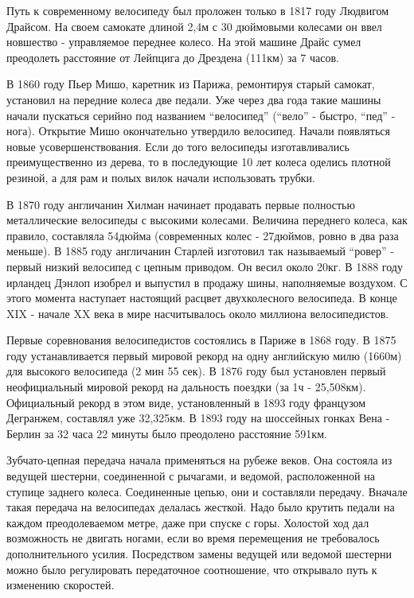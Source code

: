 \documentclass[a4paper,14pt]{extreport}
\begin{document}
Путь к современному велосипеду был проложен только в 1817 году Людвигом Драйсом. На своем самокате длиной 2,4м с 30 дюймовыми колесами он ввел новшество - управляемое переднее колесо. На этой машине Драйс сумел преодолеть расстояние от Лейпцига до Дрездена (111км) за 7 часов.

В 1860 году Пьер Мишо, каретник из Парижа, ремонтируя старый самокат, установил на передние колеса две педали. Уже через два года такие машины начали пускаться серийно под названием “велосипед” (“вело” - быстро, “пед” - нога).
Открытие Мишо окончательно утвердило велосипед. Начали появляться новые усовершенствования. Если до того велосипеды изготавливались преимущественно из дерева, то в последующие 10 лет колеса оделись плотной резиной, а для рам и полых вилок начали использовать трубки.

В 1870 году англичанин Хилман начинает продавать первые полностью металлические велосипеды с высокими колесами. Величина переднего колеса, как правило, составляла 54дюйма (современных колес - 27дюймов, ровно в два раза меньше).
В 1885 году англичанин Старлей изготовил так называемый “ровер” - первый низкий велосипед с цепным приводом. Он весил около 20кг. В 1888 году ирландец Дэнлоп изобрел и выпустил в продажу шины, наполняемые воздухом. С этого момента наступает настоящий расцвет двухколесного велосипеда. В конце XIX - начале XX века в мире насчитывалось около миллиона велосипедистов.

Первые соревнования велосипедистов состоялись в Париже в 1868 году. В 1875 году устанавливается первый мировой рекорд на одну английскую милю (1660м) для высокого велосипеда (2 мин 55 сек). В 1876 году был установлен первый неофициальный мировой рекорд на дальность поездки (за 1ч - 25,508км). Официальный рекорд в этом виде, установленный в 1893 году французом Дегранжем, составлял уже 32,325км. В 1893 году на шоссейных гонках Вена - Берлин за 32 часа 22 минуты было преодолено расстояние 591км.

Зубчато-цепная передача начала применяться на рубеже веков. Она состояла из ведущей шестерни, соединенной с рычагами, и ведомой, расположенной на ступице заднего колеса. Соединенные цепью, они и составляли передачу. Вначале такая передача на велосипедах делалась жесткой. Надо было крутить педали на каждом преодолеваемом метре, даже при спуске с горы. Холостой ход дал возможность не двигать ногами, если во время перемещения не требовалось дополнительного усилия. Посредством замены ведущей или ведомой шестерни можно было регулировать передаточное соотношение, что открывало путь к изменению скоростей.
\end{document}
